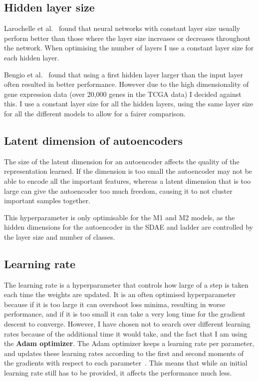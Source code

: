 \subsection{Hidden layer size}
Larochelle et al.~\cite{DBLP:journals/jmlr/LarochelleBLL09} found that neural networks with constant layer size usually perform better than
those where the layer size increases or decreases throughout the network. When optimising the number of layers I use a constant layer size
for each hidden layer.

Bengio et al.~\cite{DBLP:series/lncs/Bengio12} found that using a first hidden layer larger than the input layer often resulted in 
better performance. However due to the high dimensionality of gene expression data (over 20,000 genes in the TCGA data) I decided against 
this. I use a constant layer size for all the hidden layers, using the same layer size for all the different models to allow for a fairer
comparison.

\subsection{Latent dimension of autoencoders}
The size of the latent dimension for an autoencoder affects the quality of the representation learned. If the dimension is too small the 
autoencoder may not be able to encode all the important features, whereas a latent dimension that is too large can give the autoencoder 
too much freedom, causing it to not cluster important samples together.

This hyperparameter is only optimisable for the M1 and M2 models, as the hidden dimensions for the autoencoder in the SDAE and ladder 
are controlled by the layer size and number of classes.

\subsection{Learning rate}
The learning rate is a hyperparameter that controls how large of a step is taken each time the weights are updated. It is an often
optimised hyperparameter because if it is too large it can overshoot loss minima, resulting in worse performance, and if it is too 
small it can take a very long time for the gradient descent to converge. However, I have chosen not to search over different learning 
rates because of the additional time it would take, and the fact that I am using the \textbf{Adam optimizer}. The Adam optimizer keeps a 
learning rate per parameter, and updates these learning rates according to the first and second moments of the gradients with respect to each 
parameter~\cite{DBLP:journals/corr/KingmaB14}. This means that while an initial learning rate still has to be provided, it affects the 
performance much less.

